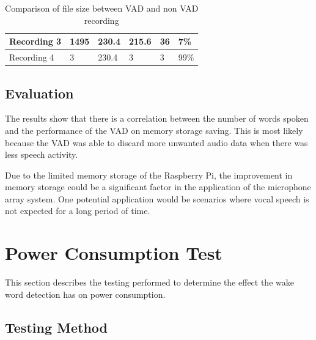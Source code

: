 \documentclass[hidelinks,12pt]{report} %
\begin{document}
\begin{table}[h]
\begin{center}
{\begin{tabular}{|l|l|l|l|l|l|}
Recording 3 & 1495                                                               & 230.4                                                                        & 215.6                                                                     & 36                                                                       & 7\%                                                                   \\ \hline
Recording 4 & 3                                                                  & 230.4                                                                        & 3                                                                         & 3                                                                        & 99\%                                                                  \\ \hline
\end{tabular}}
\label{tab:tablelabel}
\caption{Comparison of file size between VAD and non VAD recording}
\end{center}
\end{table}


\subsection{Evaluation}

The results show that there is a correlation between the number of words spoken and the performance of the VAD on memory storage saving. This is most likely because the VAD was able to discard more unwanted audio data when there was less speech activity. 

Due to the limited memory storage of the Raspberry Pi, the improvement in memory storage could be a significant factor in the application of the microphone array system. One potential application would be scenarios where vocal speech is not expected for a long period of time. 

\section{Power Consumption Test}

This section describes the testing performed to determine the effect the wake word detection has on power consumption.   

\subsection{Testing Method}
\end{document}
